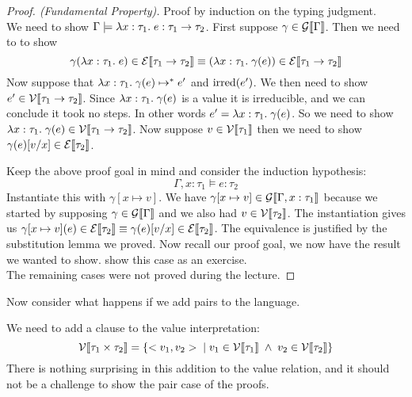 \begin{proof}[Proof. (Fundamental Property)] Proof by induction on the typing judgment.
  \case{\TAbs} \\
We need to show $\Gamma \models \lambda x : \tau_1 . \; e :  \tau_1 \rightarrow \tau_2$. First suppose $\gamma \in \mathcal{G}\llbracket \Gamma \rrbracket$. Then we need to to show
\[
  \gamma(\lambda x : \tau_1 . \; e) \in \mathcal{E}\llbracket  \tau_1 \rightarrow \tau_2 \rrbracket \equiv
  (\lambda x : \tau_1 . \; \gamma(e)) \in \mathcal{E}\llbracket  \tau_1 \rightarrow \tau_2 \rrbracket
\]
Now suppose that $\lambda x : \tau_1 . \; \gamma(e) \mapsto^{*} e'$ and $\operatorname{irred}(e')$. We then need to show $e' \in \mathcal{V}\llbracket  \tau_1 \rightarrow \tau_2 \rrbracket$. Since $\lambda x : \tau_1 . \; \gamma(e)$ is a value it is irreducible, and we can conclude it took no steps. In other words $e' = \lambda x : \tau_1 . \; \gamma(e)$. So we need to show $\lambda x : \tau_1 . \; \gamma(e) \in \mathcal{V}\llbracket  \tau_1 \rightarrow \tau_2 \rrbracket$. Now suppose $v \in \mathcal{V}\llbracket \tau_1 \rrbracket$ then we need to show $\gamma(e)[v/x] \in \mathcal{E}\llbracket \tau_2 \rrbracket$.

Keep the above proof goal in mind and consider the induction hypothesis:
\[
  \Gamma, x: \tau_1 \models e : \tau_2
\]
Instantiate this with $\gamma[x \mapsto v]$. We have $\gamma[x \mapsto v] \in \mathcal{G}\llbracket \Gamma, x : \tau_1 \rrbracket$ because we started by supposing $\gamma \in \mathcal{G}\llbracket \Gamma \rrbracket$ and we also had $v \in \mathcal{V}\llbracket \tau_2 \rrbracket$. The instantiation gives us $\gamma[x \mapsto v] (e) \in  \mathcal{E}\llbracket \tau_2 \rrbracket \equiv \gamma(e)[v/x] \in \mathcal{E}\llbracket \tau_2 \rrbracket$. The equivalence is justified by the substitution lemma we proved. Now recall our proof goal, we now have the result we wanted to show.
\case{\TApp} show this case as an exercise.\\
The remaining cases were not proved during the lecture.
\end{proof}
Now consider what happens if we add pairs to the language. 
\begin{comment}
\begin{align*}
  &\fst <v_1,v_2> \evalto v_1 \\
  &\snd <v_1,v_2> \evalto v_2
\end{align*}
\end{comment}
We need to add a clause to the value interpretation:
\[
  \mathcal{V}\llbracket \tau_1 \times \tau_2 \rrbracket = \{<v_1,v_2> \; | \; v_1 \in \mathcal{V}\llbracket \tau_1 \rrbracket \; \wedge \; v_2 \in \mathcal{V}\llbracket \tau_2 \rrbracket\}
\]
There is nothing surprising in this addition to the value relation, and it should not be a challenge to show the pair case of the proofs.

